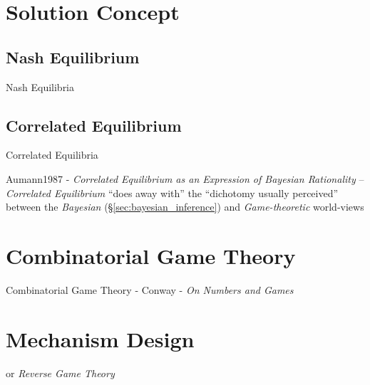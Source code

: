 \section{Solution Concept}\label{sec:solution_concept}

\subsection{Nash Equilibrium}\label{sec:nash_equilibrium}

Nash Equilibria



\subsection{Correlated Equilibrium}\label{sec:correlated_equilibrium}

Correlated Equilibria

Aumann1987 - \emph{Correlated Equilibrium as an Expression of Bayesian
  Rationality} -- \emph{Correlated Equilibrium} ``does away with'' the
``dichotomy usually perceived'' between the \emph{Bayesian}
(\S\ref{sec:bayesian_inference}) and \emph{Game-theoretic} world-views



\section{Combinatorial Game Theory}\label{sec:combinatorial_game_theory}

Combinatorial Game Theory - Conway  - \emph{On Numbers and Games}



\section{Mechanism Design}\label{sec:mechanism_design}

or \emph{Reverse Game Theory}
